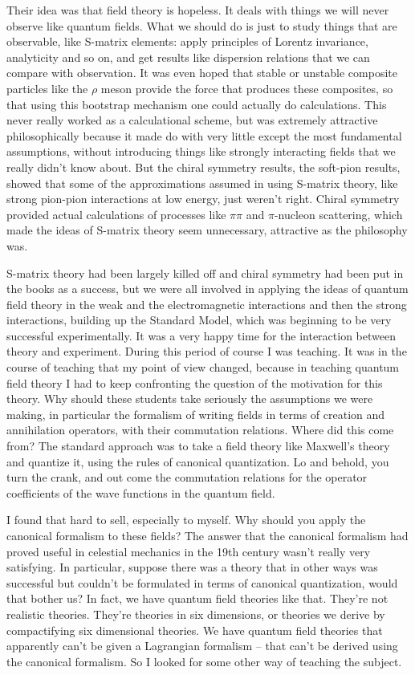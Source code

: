 \documentclass[12pt]{article}
\begin{document}
Their idea was that field theory is hopeless. It deals with things we will never observe like quantum fields. What we should do is just to study things that are observable, like  S-matrix elements: apply principles of Lorentz invariance, analyticity and so on, and get results like dispersion relations that we can  compare with observation.  It was even hoped that stable or unstable composite  particles like the $\rho$ meson  provide the force that produces these composites, so that using this bootstrap mechanism one could actually do calculations.  This never really worked as a calculational scheme, but was extremely attractive philosophically because it made do with very little except the most fundamental assumptions, without introducing things like strongly interacting fields that we really didn't know about. But the chiral symmetry results, the soft-pion results, showed that some of the approximations assumed in using S-matrix theory, like  strong  pion-pion interactions at low energy, just weren't right.  Chiral symmetry provided actual calculations of processes like $\pi\pi$ and $\pi$-nucleon scattering, which made the ideas of S-matrix theory seem unnecessary, attractive as the philosophy was.

S-matrix theory had been largely killed off and chiral symmetry had been put in the books as a success, but we were all involved in applying the ideas of quantum field theory in the weak and the electromagnetic interactions and then the strong interactions, building up the Standard Model, which was beginning to be very successful experimentally. It was a very happy time for the interaction between theory and experiment. During this period of course I was teaching.  It was in the course of teaching that my point of view changed, because in teaching quantum field theory  I had to keep confronting the question of the motivation for this theory. Why should these students take seriously the assumptions we were making, in particular the formalism of writing fields in terms of creation and annihilation operators, with their  commutation relations. Where did this come from?  The standard approach was to take a field theory like Maxwell's theory and  quantize it, using the rules of canonical quantization.  Lo and behold, you turn the crank, and out come the commutation relations for the operator coefficients of the  wave functions in the quantum field.

I found that hard to sell, especially to myself. Why should you apply the canonical formalism to these fields? The answer  that the canonical formalism  had proved useful in celestial mechanics in the 19th century wasn't really very satisfying.  In particular, suppose there was a theory that in other ways was successful but couldn't be formulated in terms of canonical quantization, would that bother us? In fact, we have quantum field theories like that. They're not realistic theories. They're theories in six dimensions, or theories we derive by compactifying six dimensional theories. We have quantum field theories that apparently can't be given a Lagrangian formalism -- that can't be derived using the canonical formalism. So I looked for some other way of teaching the subject.
\end{document}
